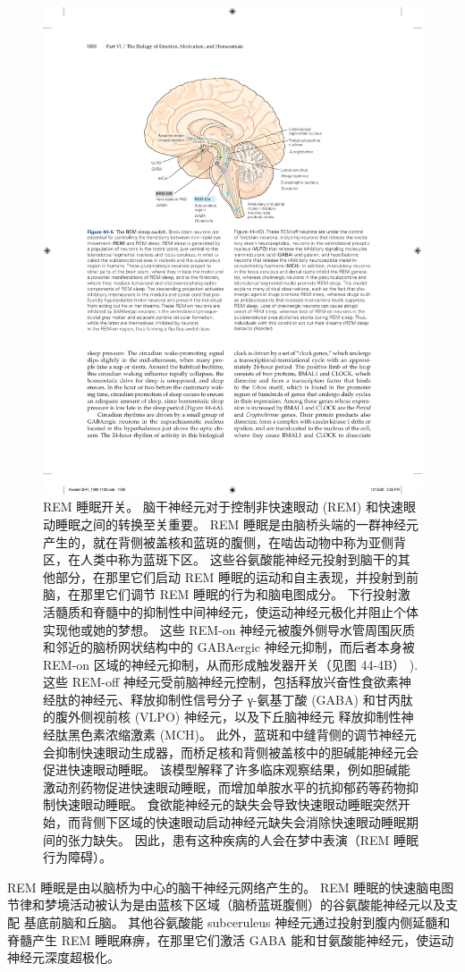 \begin{figure}[htbp]
	\centering
	\includegraphics[width=0.6\linewidth]{chap44/fig_44_5}
	\caption{REM 睡眠开关。 脑干神经元对于控制非快速眼动 (REM) 和快速眼动睡眠之间的转换至关重要。 REM 睡眠是由脑桥头端的一群神经元产生的，就在背侧被盖核和蓝斑的腹侧，在啮齿动物中称为亚侧背区，在人类中称为蓝斑下区。 这些谷氨酸能神经元投射到脑干的其他部分，在那里它们启动 REM 睡眠的运动和自主表现，并投射到前脑，在那里它们调节 REM 睡眠的行为和脑电图成分。 下行投射激活髓质和脊髓中的抑制性中间神经元，使运动神经元极化并阻止个体实现他或她的梦想。 这些 REM-on 神经元被腹外侧导水管周围灰质和邻近的脑桥网状结构中的 GABAergic 神经元抑制，而后者本身被 REM-on 区域的神经元抑制，从而形成触发器开关（见图 44-4B） ). 这些 REM-off 神经元受前脑神经元控制，包括释放兴奋性食欲素神经肽的神经元、释放抑制性信号分子 γ-氨基丁酸 (GABA) 和甘丙肽的腹外侧视前核 (VLPO) 神经元，以及下丘脑神经元 释放抑制性神经肽黑色素浓缩激素 (MCH)。 此外，蓝斑和中缝背侧的调节神经元会抑制快速眼动生成器，而桥足核和背侧被盖核中的胆碱能神经元会促进快速眼动睡眠。 该模型解释了许多临床观察结果，例如胆碱能激动剂药物促进快速眼动睡眠，而增加单胺水平的抗抑郁药等药物抑制快速眼动睡眠。 食欲能神经元的缺失会导致快速眼动睡眠突然开始，而背侧下区域的快速眼动启动神经元缺失会消除快速眼动睡眠期间的张力缺失。 因此，患有这种疾病的人会在梦中表演（REM 睡眠行为障碍）。}
	\label{fig:44_5}
\end{figure}


REM 睡眠是由以脑桥为中心的脑干神经元网络产生的。
REM 睡眠的快速脑电图节律和梦境活动被认为是由蓝核下区域（脑桥蓝斑腹侧）的谷氨酸能神经元以及支配 基底前脑和丘脑。
其他谷氨酸能 subceruleus 神经元通过投射到腹内侧延髓和脊髓产生 REM 睡眠麻痹，在那里它们激活 GABA 能和甘氨酸能神经元，使运动神经元深度超极化。


